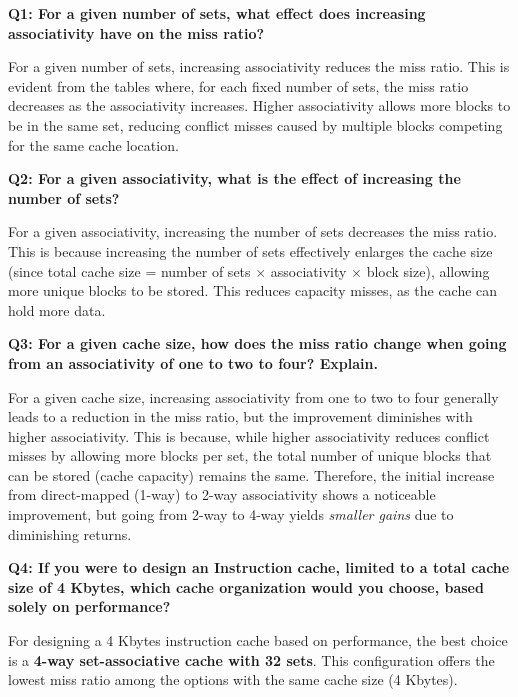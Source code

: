 \documentclass{article}
\begin{document}
\textbf{Q1: For a given number of sets, what effect does increasing associativity have on the miss ratio?}

For a given number of sets, increasing associativity reduces the miss ratio. This is evident from the tables where, for each fixed number of sets, the miss ratio decreases as the associativity increases. Higher associativity allows more blocks to be in the same set, reducing conflict misses caused by multiple blocks competing for the same cache location.

\textbf{Q2: For a given associativity, what is the effect of increasing the number of sets?}

For a given associativity, increasing the number of sets decreases the miss ratio. This is because increasing the number of sets effectively enlarges the cache size (since total cache size = number of sets $\times$ associativity $\times$ block size), allowing more unique blocks to be stored. This reduces capacity misses, as the cache can hold more data.

\textbf{Q3: For a given cache size, how does the miss ratio change when going from an associativity of one to two to four? Explain.}

For a given cache size, increasing associativity from one to two to four generally leads to a reduction in the miss ratio, but the improvement diminishes with higher associativity. This is because, while higher associativity reduces conflict misses by allowing more blocks per set, the total number of unique blocks that can be stored (cache capacity) remains the same. Therefore, the initial increase from direct-mapped (1-way) to 2-way associativity shows a noticeable improvement, but going from 2-way to 4-way yields \textit{smaller gains} due to diminishing returns.

\textbf{Q4: If you were to design an Instruction cache, limited to a total cache size of 4 Kbytes, which cache organization would you choose, based solely on performance?}

For designing a 4 Kbytes instruction cache based on performance, the best choice is a \textbf{4-way set-associative cache with 32 sets}. This configuration offers the lowest miss ratio among the options with the same cache size (4 Kbytes). 
\end{document}
